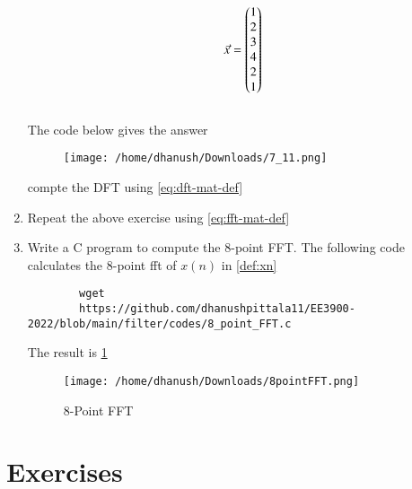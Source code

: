 \documentclass[journal,12pt,twocolumn]{IEEEtran}
\renewcommand\thesection{\arabic{section}}
\begin{document}
\begin{enumerate}[label=\arabic*.,ref=\thesection.\theenumi]
	

	\begin{align}
		\vec{x} = \begin{pmatrix}1\\2\\3\\4\\2\\1\end{pmatrix}
		\label{eq:equation1}
	\end{align}
\solution\\
The code below gives the answer
\begin{figure}[!ht]
	\centering
	\texttt{[image: /home/dhanush/Downloads/7\_11.png]}
	
\end{figure}


	compte the DFT using 
	\eqref{eq:dft-mat-def}
	
	
	
	\item Repeat the above exercise using
	\eqref{eq:fft-mat-def}
	\item Write a C program to compute the 8-point FFT. 
	\solution The following code calculates the 8-point fft of $x(n)$ in \ref{def:xn}
	\begin{lstlisting}
		wget
		https://github.com/dhanushpittala11/EE3900-2022/blob/main/filter/codes/8_point_FFT.c
	\end{lstlisting}
	The result is \ref{fig:8_point_FFT}
	\begin{figure}[!htb]
		\texttt{[image: /home/dhanush/Downloads/8pointFFT.png]}
		\caption{8-Point FFT}
		\label{fig:8_point_FFT}
		
	\end{figure}
	
\end{enumerate}









\section{Exercises}
\end{document}
